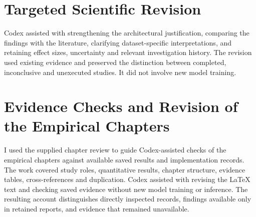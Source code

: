 \section{Targeted Scientific Revision}
Codex assisted with strengthening the architectural justification, comparing the
findings with the literature, clarifying dataset-specific interpretations, and retaining
effect sizes, uncertainty and relevant investigation history. The revision used existing
evidence and preserved the distinction between completed, inconclusive and unexecuted
studies. It did not involve new model training.

\section{Evidence Checks and Revision of the Empirical Chapters}
I used the supplied chapter review to guide Codex-assisted checks of the empirical chapters
against available saved results and implementation records. The work covered study
roles, quantitative results, chapter structure, evidence tables, cross-references and
duplication. Codex assisted with revising the LaTeX text and checking saved evidence
without new model training or inference. The resulting account distinguishes directly
inspected records, findings available only in retained reports, and evidence that
remained unavailable.
